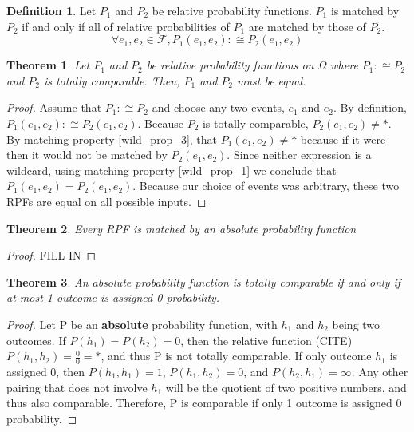 \documentclass[twoside]{article}
\theoremstyle{plain}%
\newtheorem{theorem}{Theorem}[section]
\theoremstyle{definition}
\newtheorem{definition}{Definition}[section]
\theoremstyle{remark}
\begin{document}
\begin{definition}
Let \(P_1\) and \(P_2\) be relative probability functions. \(P_1\) is matched by \(P_2\) if and only if all of relative probabilities of \(P_1\) are matched by those of \(P_2\).
\[\forall e_1, e_2 \in \mathcal{F}, P_1(e_1, e_2) :\cong P_2(e_1, e_2)\]
\end{definition}

\begin{theorem}
Let \(P_1\) and \(P_2\) be relative probability functions on \(\Omega\) where \(P_1 :\cong P_2\) and \(P_2\) is totally comparable. Then, \(P_1\) and \(P_2\) must be equal.
\end{theorem}

\begin{proof}
Assume that \(P_1 :\cong P_2\) and choose any two events, \(e_1\) and \(e_2\). By definition,  \(P_1(e_1, e_2) :\cong P_2(e_1, e_2)\). Because \(P_2\) is totally comparable, \(P_2(e_1, e_2) \neq \ast\). By matching property \ref{wild_prop_3}, that \(P_1(e_1, e_2) \neq \ast\) because if it were then it would not be matched by \(P_2(e_1, e_2)\). Since neither expression is a wildcard, using matching property \ref{wild_prop_1} we conclude that \(P_1(e_1, e_2) = P_2(e_1, e_2)\). Because our choice of events was arbitrary, these two RPFs are equal on all possible inputs.
\end{proof}

\begin{theorem}
Every RPF is matched by an absolute probability function
\end{theorem}

\begin{proof}
FILL IN
\end{proof}

\begin{theorem}
An absolute probability function is totally comparable if and only if at most 1 outcome is assigned 0 probability.
\end{theorem}

\begin{proof}
Let P be an \textbf{absolute} probability function, with \(h_1\) and \(h_2\) being two outcomes. If \(P(h_1) = P(h_2) = 0\), then the relative function (CITE) \(P(h_1, h_2) = \frac{0}{0} = \ast\), and thus P is not totally comparable. If only outcome \(h_1\) is assigned 0, then \(P(h_1, h_1) = 1\), \(P(h_1, h_2) = 0\), and \(P(h_2, h_1) = \infty\). Any other pairing that does not involve \(h_1\) will be the quotient of two positive numbers, and thus also comparable. Therefore, P is comparable if only 1 outcome is assigned 0 probability.
\end{proof}
\end{document}
